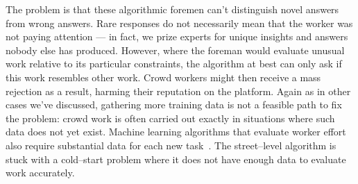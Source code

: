 \documentclass[street-level_algorithms]{subfiles}
\begin{document}
The problem is that
these algorithmic foremen can't distinguish novel answers from wrong answers.
Rare responses do not necessarily mean that the worker was not paying attention
--- in fact, we prize experts for unique insights and answers nobody else has produced.
However, where the foreman would evaluate unusual work relative to its particular constraints,
the algorithm at best can only ask if this work resembles other work.
Crowd workers might then receive a mass rejection as a result,
harming their reputation on the platform.
Again as in other cases we've discussed, gathering more training data is not a feasible path to fix the problem:
crowd work is often carried out exactly in situations where such data does not yet exist.
Machine learning algorithms that evaluate worker effort also require
substantial data for each new task~\cite{rzeszotarski2011instrumenting}.
The street--level algorithm is stuck with a cold--start problem where
it does not have enough data to evaluate work accurately.

\onlyinsubfile{
  
  
}
\end{document}

